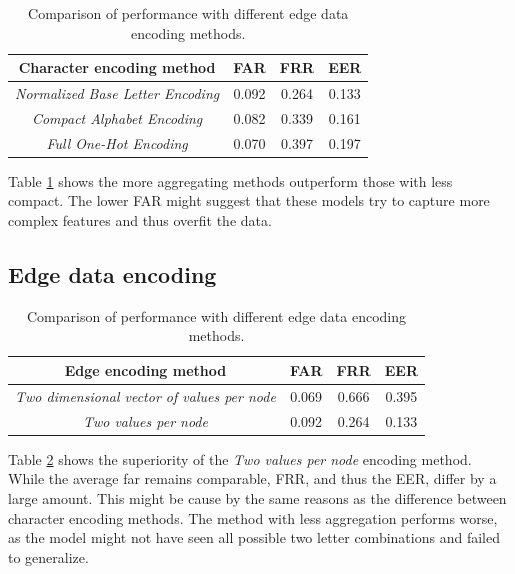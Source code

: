 \begin{center}
	\begin{table}[H]
		\begin{center}
			\begin{tabular}{ |c|c|c|c| } 
				\hline
				Character encoding method & FAR & FRR & EER \\
				\hline
				\textit{Normalized Base Letter Encoding} & 0.092 & 0.264 & 0.133 \\
				\hline
				\textit{Compact Alphabet Encoding} & 0.082 & 0.339 & 0.161 \\
				\hline
				\textit{Full One-Hot Encoding} & 0.070 & 0.397 & 0.197 \\
				\hline
			\end{tabular}
		\end{center}
		\caption{Comparison of performance with different edge data encoding methods.}
		\label{table:char_encoding}
	\end{table}
\end{center}

Table \ref{table:char_encoding} shows the more aggregating methods outperform those with less compact. The lower FAR might suggest that these models try to capture more complex features and thus overfit the data.

\subsection{Edge data encoding}

\begin{center}
	\begin{table}[H]
		\begin{center}
			\begin{tabular}{ |c|c|c|c| } 
				\hline
				Edge encoding method & FAR & FRR & EER \\
				\hline
				\textit{Two dimensional vector of values per node} & 0.069 & 0.666 & 0.395 \\
				\hline
				\textit{Two values per node} & 0.092 & 0.264 & 0.133 \\
				\hline
			\end{tabular}
		\end{center}
		\caption{Comparison of performance with different edge data encoding methods.}
		\label{table:egde_encoding_comp}
	\end{table}
\end{center}

Table \ref{table:egde_encoding_comp} shows the superiority of the \textit{Two values per node} encoding method. While the average far remains comparable, FRR, and thus the EER, differ by a large amount. This might be cause by the same reasons as the difference between character encoding methods. The method with less aggregation performs worse, as the model might not have seen all possible two letter combinations and failed to generalize.


